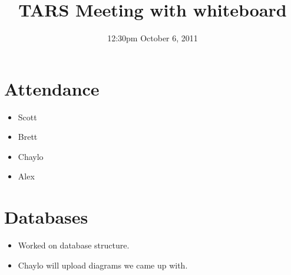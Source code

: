 \documentclass{article}
\begin{document}
\title{TARS Meeting with whiteboard}
\date{12:30pm October 6, 2011}
\maketitle

\section{Attendance}
\begin{itemize}
\item Scott
\item Brett
\item Chaylo
\item Alex
\end{itemize}

\section{Databases}
\begin{itemize}
\item Worked on database structure.
\item Chaylo will upload diagrams we came up with.
\end{itemize}
\end{document}
